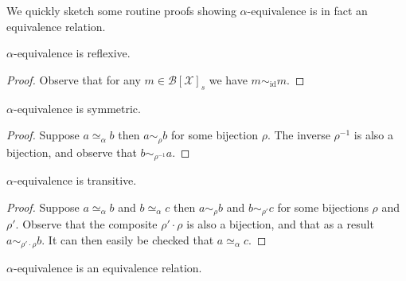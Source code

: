 We quickly sketch some routine proofs showing $\alpha$-equivalence is in fact an equivalence relation.

\begin{lemma}[Reflexivity]
    $\alpha$-equivalence is reflexive.
\end{lemma}
    
\begin{proof}    
     Observe that for any $m \in \mathcal{B}[\mathcal{X}]_s$ we have $m \sim_{\mathrm{id}} m$. 
\end{proof}

\begin{lemma}[Symmetry]
    $\alpha$-equivalence is symmetric.
\end{lemma}

\begin{proof}
    Suppose $a \simeq_\alpha b$ then $a \sim_\rho b$ for some bijection $\rho$. The inverse $\rho^{-1}$ is also a bijection, and observe that $b \sim_{\rho^{-1}} a$.
\end{proof}

\begin{lemma}
    $\alpha$-equivalence is transitive.
\end{lemma}

\begin{proof}
    Suppose $a \simeq_\alpha b$ and $b \simeq_\alpha c$ then $a \sim_\rho b$ and $b \sim_{\rho'} c$ for some bijections $\rho$ and $\rho'$. Observe that the composite $\rho' \cdot \rho$ is also a bijection, and that as a result $a \sim_{\rho' \cdot \rho} b$. It can then easily be checked that $a \simeq_\alpha c$.
\end{proof}

\begin{cor}
    $\alpha$-equivalence is an equivalence relation.
\end{cor}

